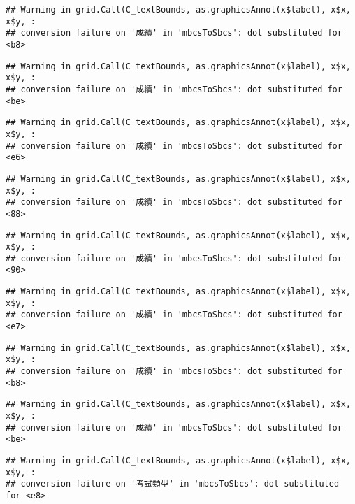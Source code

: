 \documentclass[
]{book}
\begin{document}
\begin{verbatim}
## Warning in grid.Call(C_textBounds, as.graphicsAnnot(x$label), x$x, x$y, :
## conversion failure on '成績' in 'mbcsToSbcs': dot substituted for <b8>
\end{verbatim}

\begin{verbatim}
## Warning in grid.Call(C_textBounds, as.graphicsAnnot(x$label), x$x, x$y, :
## conversion failure on '成績' in 'mbcsToSbcs': dot substituted for <be>
\end{verbatim}

\begin{verbatim}
## Warning in grid.Call(C_textBounds, as.graphicsAnnot(x$label), x$x, x$y, :
## conversion failure on '成績' in 'mbcsToSbcs': dot substituted for <e6>
\end{verbatim}

\begin{verbatim}
## Warning in grid.Call(C_textBounds, as.graphicsAnnot(x$label), x$x, x$y, :
## conversion failure on '成績' in 'mbcsToSbcs': dot substituted for <88>
\end{verbatim}

\begin{verbatim}
## Warning in grid.Call(C_textBounds, as.graphicsAnnot(x$label), x$x, x$y, :
## conversion failure on '成績' in 'mbcsToSbcs': dot substituted for <90>
\end{verbatim}

\begin{verbatim}
## Warning in grid.Call(C_textBounds, as.graphicsAnnot(x$label), x$x, x$y, :
## conversion failure on '成績' in 'mbcsToSbcs': dot substituted for <e7>
\end{verbatim}

\begin{verbatim}
## Warning in grid.Call(C_textBounds, as.graphicsAnnot(x$label), x$x, x$y, :
## conversion failure on '成績' in 'mbcsToSbcs': dot substituted for <b8>
\end{verbatim}

\begin{verbatim}
## Warning in grid.Call(C_textBounds, as.graphicsAnnot(x$label), x$x, x$y, :
## conversion failure on '成績' in 'mbcsToSbcs': dot substituted for <be>
\end{verbatim}

\begin{verbatim}
## Warning in grid.Call(C_textBounds, as.graphicsAnnot(x$label), x$x, x$y, :
## conversion failure on '考試類型' in 'mbcsToSbcs': dot substituted for <e8>
\end{verbatim}
\end{document}
